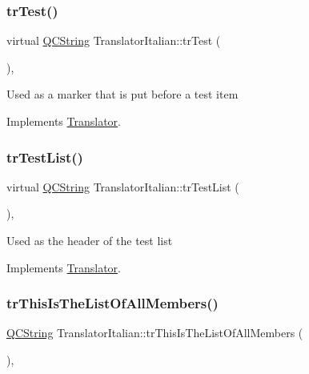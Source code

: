 \subsubsection{\texorpdfstring{trTest()}{trTest()}}
{\footnotesize\ttfamily virtual \mbox{\hyperlink{class_q_c_string}{Q\+C\+String}} Translator\+Italian\+::tr\+Test (\begin{DoxyParamCaption}{ }\end{DoxyParamCaption})\hspace{0.3cm}{\ttfamily [inline]}, {\ttfamily [virtual]}}

Used as a marker that is put before a test item 

Implements \mbox{\hyperlink{class_translator}{Translator}}.

\mbox{\label{class_translator_italian_aa5159c060ab25815dd0a582a9d89652c}} 
\subsubsection{\texorpdfstring{trTestList()}{trTestList()}}
{\footnotesize\ttfamily virtual \mbox{\hyperlink{class_q_c_string}{Q\+C\+String}} Translator\+Italian\+::tr\+Test\+List (\begin{DoxyParamCaption}{ }\end{DoxyParamCaption})\hspace{0.3cm}{\ttfamily [inline]}, {\ttfamily [virtual]}}

Used as the header of the test list 

Implements \mbox{\hyperlink{class_translator}{Translator}}.

\mbox{\label{class_translator_italian_af478fd19300caf8566bb4966309110f3}} 
\subsubsection{\texorpdfstring{trThisIsTheListOfAllMembers()}{trThisIsTheListOfAllMembers()}}
{\footnotesize\ttfamily \mbox{\hyperlink{class_q_c_string}{Q\+C\+String}} Translator\+Italian\+::tr\+This\+Is\+The\+List\+Of\+All\+Members (\begin{DoxyParamCaption}{ }\end{DoxyParamCaption})\hspace{0.3cm}{\ttfamily [inline]}, {\ttfamily [virtual]}}

